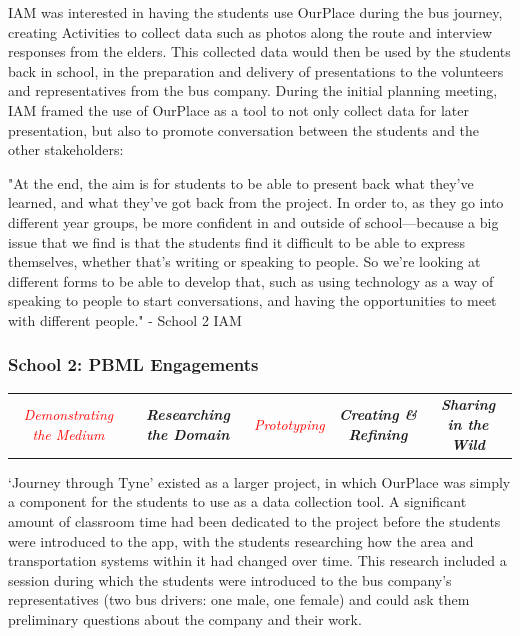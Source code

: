 IAM was interested in having the students use OurPlace during the bus journey, creating Activities to collect data such as photos along the route and interview responses from the elders. This collected data would then be used by the students back in school, in the preparation and delivery of presentations to the volunteers and representatives from the bus company. During the initial planning meeting, IAM framed the use of OurPlace as a tool to not only collect data for later presentation, but also to promote conversation between the students and the other stakeholders:

\begin{displayquote}
"At the end, the aim is for students to be able to present back what they've learned, and what they've got back from the project. In order to, as they go into different year groups, be more confident in and outside of school---because a big issue that we find is that the students find it difficult to be able to express themselves, whether that's writing or speaking to people. So we're looking at different forms to be able to develop that, such as using technology as a way of speaking to people to start conversations, and having the opportunities to meet with different people." - School 2 IAM
\end{displayquote}

\subsubsection{School 2: PBML Engagements}

\begin{table}[h]
    \centering
    \begin{tabulary}{\textwidth}{C|C|p{19mm}|C|C}
    \small\textit{\textcolor{red}{Demonstrating the Medium}} 
    & \small\textit{\textbf{Researching the Domain}}
    & \small\textit{\textcolor{red}{Prototyping}}
    & \small\textit{\textbf{Creating \& Refining}}
    & \small\textit{\textbf{Sharing in the Wild}}\\
\end{tabulary}
\end{table}

`Journey through Tyne' existed as a larger project, in which OurPlace was simply a component for the students to use as a data collection tool. A significant amount of classroom time had been dedicated to the project before the students were introduced to the app, with the students researching how the area and transportation systems within it had changed over time. This research included a session during which the students were introduced to the bus company's representatives (two bus drivers: one male, one female) and could ask them preliminary questions about the company and their work. 

